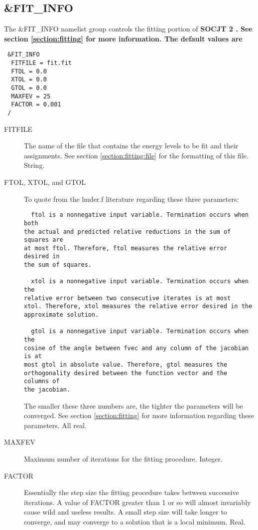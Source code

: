 \documentclass{article}
\newcommand{\socjttwo}{\bf{SOCJT 2 }}
\begin{document}
\subsection{\&FIT\_INFO} \label{fitinfo}

The \&FIT\_INFO namelist group controls the fitting portion of \socjttwo
. See section \ref{section:fitting} for more information. The default values are

\begin{verbatim}
 &FIT_INFO
  FITFILE = fit.fit
  FTOL = 0.0
  XTOL = 0.0
  GTOL = 0.0
  MAXFEV = 25
  FACTOR = 0.001
 /
\end{verbatim}

\begin{description}

\item[FITFILE] The name of the file that contains the energy levels
  to be fit and their assignments.  See section \ref{section:fitting:file} for
  the formatting of this file. String.

\item[FTOL, XTOL, and GTOL] To quote from the lmder.f
  literature regarding these three parameters:
  \begin{verbatim}
  ftol is a nonnegative input variable. Termination occurs when both
the actual and predicted relative reductions in the sum of squares are
at most ftol. Therefore, ftol measures the relative error desired in
the sum of squares. 

  xtol is a nonnegative input variable. Termination occurs when the
relative error between two consecutive iterates is at most
xtol. Therefore, xtol measures the relative error desired in the
approximate solution. 

  gtol is a nonnegative input variable. Termination occurs when the
cosine of the angle between fvec and any column of the jacobian is at
most gtol in absolute value. Therefore, gtol measures the
orthogonality desired between the function vector and the columns of
the jacobian. 
 \end{verbatim}

 The smaller these three numbers are, the tighter the parameters will
 be converged. See section \ref{section:fitting} for more
 information regarding these parameters. All real.

\item[MAXFEV] Maximum number of iterations for the fitting
  procedure. Integer.

\item[FACTOR] Essentially the step size the fitting procedure takes
  between successive iterations. A value of FACTOR greater than 1 or
  so will almost invariably cause wild and useless results. A small
  step size will take longer to converge, and may converge to a
  solution that is a local minimum. Real.

\end{description}
\end{document}
